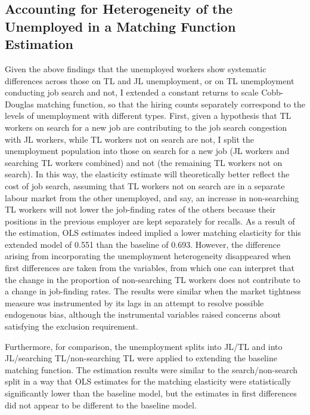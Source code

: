 \documentclass[a4paper, 11pt, tikz]{article}
\begin{document}
\subsection{Accounting for Heterogeneity of the Unemployed in a Matching Function Estimation}
Given the above findings that the unemployed workers show systematic differences across those on TL and JL unemployment, or on TL unemployment conducting job search and not, I extended a constant returns to scale Cobb-Douglas matching function, so that the hiring counts separately correspond to the levels of unemployment with different types.
First, given a hypothesis that TL workers on search for a new job are contributing to the job search congestion with JL workers, while TL workers not on search are not, I split the unemployment population into those on search for a new job (JL workers and searching TL workers combined) and not (the remaining TL workers not on search).
In this way, the elasticity estimate will theoretically better reflect the cost of job search, assuming that TL workers not on search are in a separate labour market from the other unemployed, and say, an increase in non-searching TL workers will not lower the job-finding rates of the others because their positions in the previous employer are kept separately for recalls.
As a result of the estimation, OLS estimates indeed implied a lower matching elasticity for this extended model of 0.551 than the baseline of 0.693.
However, the difference arising from incorporating the unemployment heterogeneity disappeared when first differences are taken from the variables, from which one can interpret that the change in the proportion of non-searching TL workers does not contribute to a change in job-finding rates.
The results were similar when the market tightness measure was instrumented by its lags in an attempt to resolve possible endogenous bias, although the instrumental variables raised concerns about satisfying the exclusion requirement.

Furthermore, for comparison, the unemployment splits into JL/TL and into JL/searching TL/non-searching TL were applied to extending the baseline matching function.
The estimation results were similar to the search/non-search split in a way that OLS estimates for the matching elasticity were statistically significantly lower than the baseline model, but the estimates in first differences did not appear to be different to the baseline model.
\end{document}
